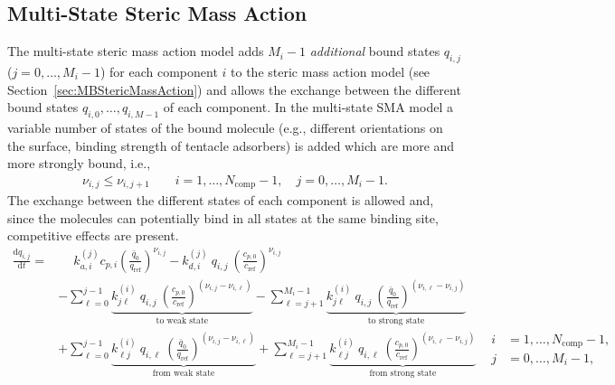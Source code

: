 \subsection{Multi-State Steric Mass Action}\label{sec:MBMultiStateStericMassAction}

The multi-state steric mass action model adds $M_i-1$ \emph{additional} bound states $q_{i,j}$ ($j = 0, \dots, M_i - 1$) for each component $i$ to the steric mass action model (see Section~\ref{sec:MBStericMassAction}) and allows the exchange between the different bound states $q_{i,0}, \dots, q_{i,M-1}$ of each component. 
In the multi-state SMA model a variable number of states of the bound molecule (e.g., different orientations on the surface, binding strength of tentacle adsorbers) is added which are more and more strongly bound, i.e.,
\begin{align*}
  \nu_{i,j} \leq \nu_{i,j+1} \qquad i = 1, \dots, N_{\text{comp}} - 1, \quad j = 0,\dots, M_i - 1.
\end{align*}
The exchange between the different states of each component is allowed and, since the molecules can potentially bind in all states at the same binding site, competitive effects are present.
\begin{align*}
  \frac{\mathrm{d} q_{i,j}}{\mathrm{d} t} =& \phantom{+} k_{a,i}^{(j)} c_{p,i} \left(\frac{\bar{q}_0}{q_{\text{ref}}}\right)^{\nu_{i,j}} - k_{d,i}^{(j)}\: q_{i,j}\: \left(\frac{c_{p,0}}{c_{\text{ref}}}\right)^{\nu_{i,j}} \\
  &- \sum_{\ell = 0}^{j-1} \underbrace{k^{(i)}_{j\ell}\: q_{i,j}\: \left(\frac{c_{p,0}}{c_{\text{ref}}}\right)^{\left(\nu_{i,j} - \nu_{i,\ell}\right)}}_{\text{to weak state}} - \sum_{\ell = j+1}^{M_i - 1} \underbrace{k^{(i)}_{j\ell}\: q_{i,j}\: \left(\frac{\bar{q}_0}{q_{\text{ref}}}\right)^{\left(\nu_{i,\ell} - \nu_{i,j}\right)}}_{\text{to strong state}} \\
  &+ \sum_{\ell = 0}^{j-1} \underbrace{k^{(i)}_{\ell j}\: q_{i,\ell}\: \left(\frac{\bar{q}_0}{q_{\text{ref}}}\right)^{\left(\nu_{i,j} - \nu_{i,\ell}\right)}}_{\text{from weak state}} + \sum_{\ell = j+1}^{M_i - 1} \underbrace{k^{(i)}_{\ell j}\: q_{i,\ell}\: \left(\frac{c_{p,0}}{c_{\text{ref}}}\right)^{\left(\nu_{i,\ell} - \nu_{i,j}\right)}}_{\text{from strong state}} & \begin{aligned}
    i &= 1, \dots, N_{\text{comp}} - 1, \\ j &= 0, \dots, M_i - 1,
  \end{aligned}
\end{align*}
